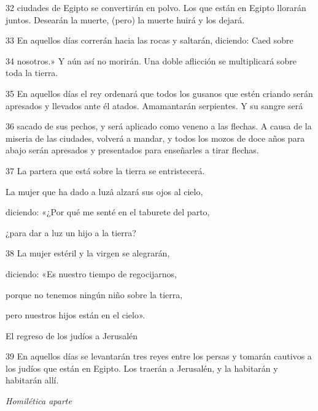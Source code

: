 \par 32 ciudades de Egipto se convertirán en polvo. Los que están en Egipto llorarán juntos. Desearán la muerte, (pero) la muerte huirá y los dejará.

\par 33 En aquellos días correrán hacia las rocas y saltarán, diciendo: Caed sobre

\par 34 nosotros.» Y aún así no morirán. Una doble aflicción se multiplicará sobre toda la tierra.

\par 35 En aquellos días el rey ordenará que todos los gusanos que estén criando serán apresados ​​y llevados ante él atados. Amamantarán serpientes. Y su sangre será

\par 36 sacado de sus pechos, y será aplicado como veneno a las flechas. A causa de la miseria de las ciudades, volverá a mandar, y todos los mozos de doce años para abajo serán apresados ​​y presentados para enseñarles a tirar flechas.

\par 37 La partera que está sobre la tierra se entristecerá.

\par La mujer que ha dado a luzâ alzará sus ojos al cielo,

\par diciendo: «¿Por qué me senté en el taburete del parto,

\par ¿para dar a luz un hijo a la tierra?

\par 38 La mujer estéril y la virgen se alegrarán,

\par diciendo: «Es nuestro tiempo de regocijarnos,

\par porque no tenemos ningún niño sobre la tierra,

\par pero nuestros hijos están en el cielo».

\par El regreso de los judíos a Jerusalén

\par 39 En aquellos días se levantarán tres reyes entre los persas y tomarán cautivos a los judíos que están en Egipto. Los traerán a Jerusalén, y la habitarán y habitarán allí.

\par \textit{Homilética aparte}


